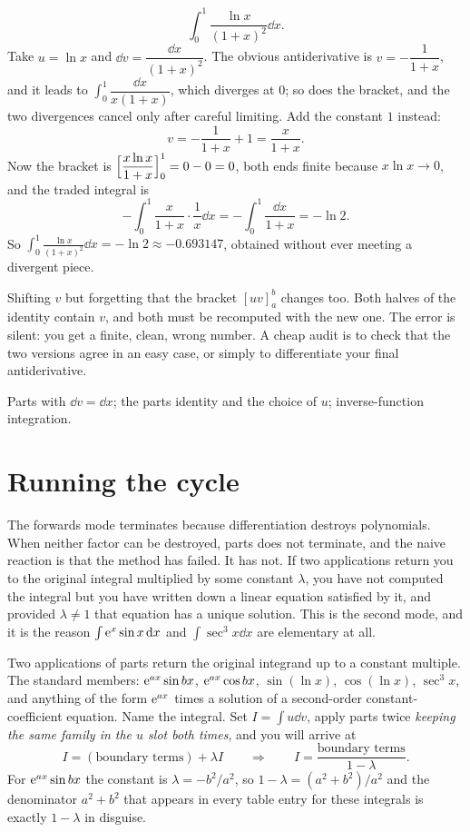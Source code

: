\begin{worked}
\[\int_0^1\frac{\ln x}{(1+x)^{2}}\dd x.\]
Take $u=\ln x$ and $\dd v=\dfrac{\dd x}{(1+x)^{2}}$. The obvious antiderivative is $v=-\dfrac{1}{1+x}$, and it leads to $\int_0^1\dfrac{\dd x}{x(1+x)}$, which diverges at $0$; so does the bracket, and the two divergences cancel only after careful limiting. Add the constant $1$ instead:
\[v=-\frac{1}{1+x}+1=\frac{x}{1+x}.\]
Now the bracket is $\Bigl[\dfrac{x\ln x}{1+x}\Bigr]_0^1=0-0=0$, both ends finite because $x\ln x\to0$, and the traded integral is
\[-\int_0^1\frac{x}{1+x}\cdot\frac1x\dd x=-\int_0^1\frac{\dd x}{1+x}=-\ln2.\]
So $\displaystyle\int_0^1\frac{\ln x}{(1+x)^{2}}\dd x=-\ln2\approx-0.693147$, obtained without ever meeting a divergent piece.
\end{worked}

\begin{trap}
Shifting $v$ but forgetting that the bracket $[uv]_a^b$ changes too. Both halves of the identity contain $v$, and both must be recomputed with the new one. The error is silent: you get a finite, clean, wrong number. A cheap audit is to check that the two versions agree in an easy case, or simply to differentiate your final antiderivative.
\end{trap}

\begin{seealsob}Parts with $\dd v=\dd x$; the parts identity and the choice of $u$; inverse-function integration.\end{seealsob}

\section{Running the cycle}

The forwards mode terminates because differentiation destroys polynomials. When neither factor can be destroyed, parts does not terminate, and the naive reaction is that the method has failed. It has not. If two applications return you to the original integral multiplied by some constant $\lambda$, you have not computed the integral but you have written down a linear equation satisfied by it, and provided $\lambda\neq1$ that equation has a unique solution. This is the second mode, and it is the reason $\int\mathrm{e}^{x}\sin x\,\mathrm{d} x$ and $\int\sec^{3}x\dd x$ are elementary at all.

\cue Two applications of parts return the original integrand up to a constant multiple. The standard members: $\mathrm{e}^{ax}\sin bx$, $\mathrm{e}^{ax}\cos bx$, $\sin(\ln x)$, $\cos(\ln x)$, $\sec^{3}x$, and anything of the form $\mathrm{e}^{ax}$ times a solution of a second-order constant-coefficient equation.
\method Name the integral. Set $I=\int u\dd v$, apply parts twice \emph{keeping the same family in the $u$ slot both times}, and you will arrive at
\[I=(\text{boundary terms})+\lambda I\qquad\Longrightarrow\qquad I=\frac{\text{boundary terms}}{1-\lambda}.\]
For $\mathrm{e}^{ax}\sin bx$ the constant is $\lambda=-b^{2}/a^{2}$, so $1-\lambda=(a^{2}+b^{2})/a^{2}$ and the denominator $a^{2}+b^{2}$ that appears in every table entry for these integrals is exactly $1-\lambda$ in disguise.

